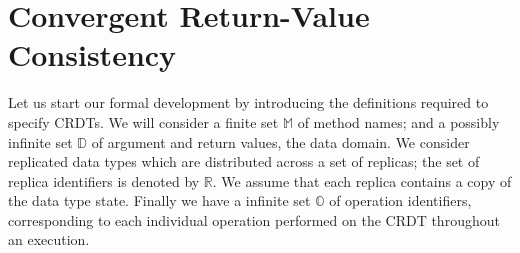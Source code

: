 
\section{Convergent Return-Value Consistency}
\label{sec:specifications and consistencies}












Let us start our formal development by introducing the definitions
required to specify CRDTs.
%
We will consider a finite set $\mathbb{M}$ of method names; and a possibly
infinite set $\mathbb{D}$ of argument and return values, the data
domain.
%
We consider replicated data types which are distributed across a set
of replicas; the set of replica identifiers is denoted by $\mathbb{R}$.
We assume that each replica contains a copy of the data type state.
Finally we have a infinite set $\mathbb{O}$ of operation identifiers,
corresponding to each individual operation performed on the CRDT
throughout an execution.
%

